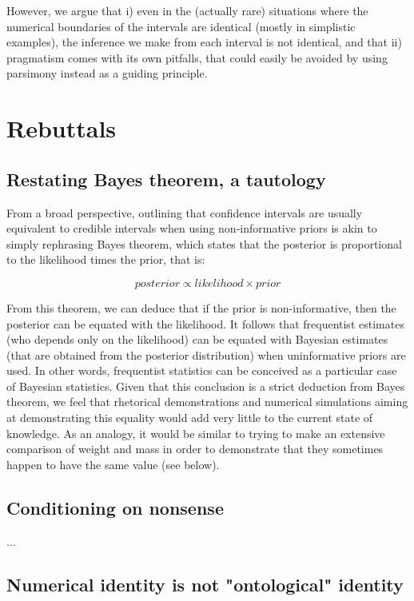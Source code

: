 \documentclass[a4paper,man,natbib,floatsintext,donotrepeattitle]{apa6}
\begin{document}
\renewcommand{\thefootnote}{\arabic{footnote}}

However, we argue that i) even in the (actually rare) situations where the numerical boundaries of the intervals are identical (mostly in simplistic examples), the inference we make from each interval is not identical, and that ii) pragmatism comes with its own pitfalls, that could easily be avoided by using parsimony instead as a guiding principle.

\section{Rebuttals}

\subsection{Restating Bayes theorem, a tautology}

From a broad perspective, outlining that confidence intervals are usually equivalent to credible intervals when using non-informative priors is akin to simply rephrasing Bayes theorem, which states that the posterior is proportional to the likelihood times the prior, that is:

$$ posterior \propto likelihood \times prior $$

From this theorem, we can deduce that if the prior is non-informative, then the posterior can be equated with the likelihood. It follows that frequentist estimates (who depends only on the likelihood) can be equated with Bayesian estimates (that are obtained from the posterior distribution) when uninformative priors are used. In other words, frequentist statistics can be conceived as a particular case of Bayesian statistics. Given that this conclusion is a strict deduction from Bayes theorem, we feel that rhetorical demonstrations and numerical simulations aiming at demonstrating this equality would add very little to the current state of knowledge. As an analogy, it would be similar to trying to make an extensive comparison of weight and mass in order to demonstrate that they sometimes happen to have the same value (see below).

\subsection{Conditioning on nonsense}

...

\subsection{Numerical identity is not "ontological" identity}
\end{document}

